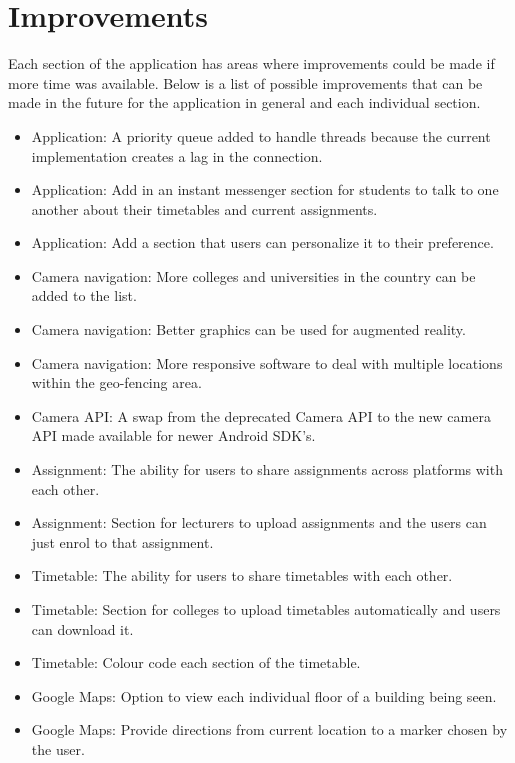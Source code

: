 \pagebreak\section{Improvements}
Each section of the application has areas where improvements could be made if more time was available. Below is a list of possible improvements that can be made in the future for the application in general and each individual section. 
\begin{itemize}
	\item Application: A priority queue added to handle threads because the current implementation creates a lag in the connection.
	\item Application: Add in an instant messenger section for students to talk to one another about their timetables and current assignments.
	\item Application: Add a section that users can personalize it to their preference.
	
	\item Camera navigation: More colleges and universities in the country can be added to the list.
	\item Camera navigation: Better graphics can be used for augmented reality.
	\item Camera navigation: More responsive software to deal with multiple locations within the geo-fencing area.
	\item Camera API: A swap from the deprecated Camera API to the new camera API made available for newer Android SDK's. 
	
	\item Assignment: The ability for users to share assignments across platforms with each other.
	\item Assignment: Section for lecturers to upload assignments and the users can just enrol to that assignment.
	
	\item Timetable: The ability for users to share timetables with each other.
	\item Timetable: Section for colleges to upload timetables automatically and users can download it.
	\item Timetable: Colour code each section of the timetable.
	
	\item Google Maps: Option to view each individual floor of a building being seen.
	\item Google Maps: Provide directions from current location to a marker chosen by the user.
\end{itemize}

